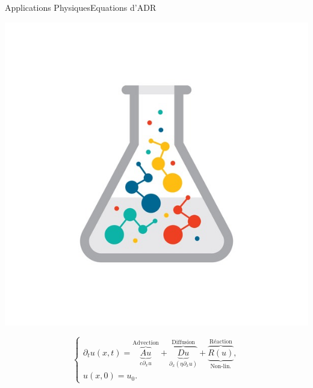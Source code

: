 \begin{frame}{Applications Physiques}{Equations d'ADR}
\begin{center}
    \includegraphics[height=0.4\textheight]{medias/1_/chemical_reaction.png}
\end{center}
\pause
    \begin{equation}
        \begin{cases}
            \partial_t u(x,t) = 
                \overbrace{\underbrace{A u}_{c \partial_x u}}^{\text{Advection}}+ 
                \overbrace{\underbrace{D u}_{\partial_x(\eta \partial_x u)}}^{\text{Diffusion}}+ 
                \overbrace{\underbrace{R(u)}_{\text{Non-lin.}}}^{\text{Réaction}},\\[4pt]
            u(x,0)=u_0.
        \end{cases}
    \end{equation}

\end{frame}